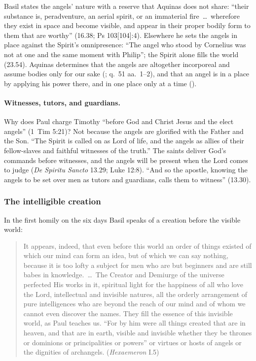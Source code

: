 Basil states the angels' nature with a reserve that Aquinas does not
share: ``their substance is, peradventure, an aerial spirit, or an
immaterial fire~\dots\ wherefore they exist in space and become visible,
and appear in their proper bodily form to them that are worthy'' (16.38;
Ps 103[104]:4). Elsewhere he sets the angels in place against the
Spirit's omnipresence: ``The angel who stood by Cornelius was not at one
and the same moment with Philip''; the Spirit alone fills the world
(23.54). Aquinas determines that the angels are altogether incorporeal
and assume bodies only for our sake (; q.~51 aa.~1--2),
and that an angel is in a place by applying his power there, and in one
place only at a time ().

\paragraph{Witnesses, tutors, and guardians.} Why does Paul charge
Timothy ``before God and Christ Jesus and the elect angels'' (1~Tim
5:21)? Not because the angels are glorified with the Father and the
Son. ``The Spirit is called on as Lord of life, and the angels as allies
of their fellow-slaves and faithful witnesses of the truth.'' The saints
deliver God's commands before witnesses, and the angels will be present
when the Lord comes to judge (\emph{De Spiritu Sancto} 13.29; Luke 12:8).
``And so the apostle, knowing the angels to be set over men as tutors
and guardians, calls them to witness'' (13.30).

\subsubsection{The intelligible creation}

In the first homily on the six days Basil speaks of a creation before the
visible world:

\begin{quote}
It appears, indeed, that even before this world an order of things
existed of which our mind can form an idea, but of which we can say
nothing, because it is too lofty a subject for men who are but beginners
and are still babes in knowledge.~\dots\ The Creator and Demiurge of the
universe perfected His works in it, spiritual light for the happiness of
all who love the Lord, intellectual and invisible natures, all the
orderly arrangement of pure intelligences who are beyond the reach of our
mind and of whom we cannot even discover the names. They fill the essence
of this invisible world, as Paul teaches us. ``For by him were all things
created that are in heaven, and that are in earth, visible and invisible
whether they be thrones or dominions or principalities or powers'' or
virtues or hosts of angels or the dignities of archangels.
(\emph{Hexaemeron} I.5)
\end{quote}

